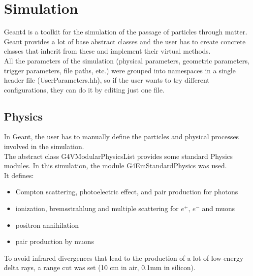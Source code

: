 \documentclass[10pt, a4paper, twocolumn]{article} %
\begin{document}
\section{Simulation}
Geant4 is a toolkit for the simulation of the passage of particles through matter.
\\
Geant provides a lot of base abstract classes and the user has to create concrete classes that inherit from these and implement their virtual methods.
\\
All the parameters of the simulation (physical parameters, geometric parameters, trigger parameters, file paths, etc.) were grouped into namespaces in a single header file (UserParameters.hh), so if the user wants to try different configurations, they can do it by editing just one file.

\subsection{Physics}
In Geant, the user has to manually define the particles and physical processes involved in the simulation.
\\
The abstract class G4VModularPhysicsList provides some standard Physics modules. In this simulation, the module G4EmStandardPhysics was used.
\\
It defines:
\begin{itemize}
    \item Compton scattering, photoelectric effect, and pair production for photons
    \item ionization, bremsstrahlung and multiple scattering for $e^+$, $e^-$ and muons
    \item positron annihilation
    \item pair production by muons
\end{itemize}
To avoid infrared divergences that lead to the production of a lot of low-energy delta rays, a range cut was set (10 cm in air, 0.1mm in silicon).
\end{document}
